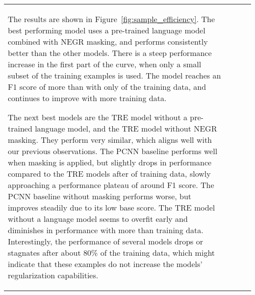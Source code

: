 \documentclass[akbc,twoside,11pt]{article}
\begin{document}
\begin{table}[ht!]
\begin{tabular}{p{6cm} l l l}
The results are shown in Figure~\ref{fig:sample_efficiency}. The best performing model uses a pre-trained language model combined with NEGR masking, and performs consistently better than the other models. There is a steep performance increase in the first part of the curve, when only a small subset of the training examples is used. The model reaches an F1 score of more than  with only  of the training data, and continues to improve with more training data. 

The next best models are the TRE model without a pre-trained language model, and the TRE model without NEGR masking. They perform very similar, which aligns well with our previous observations. The PCNN baseline performs well when masking is applied, but slightly drops in performance compared to the TRE models after  of training data, slowly approaching a performance plateau of around  F1 score. The PCNN baseline without masking performs worse, but improves steadily due to its low base score. The TRE model without a language model seems to overfit early and diminishes in performance with more than  training data. Interestingly, the performance of several models drops or stagnates after about 80\% of the training data, which might indicate that these examples do not increase the models' regularization capabilities.



\end{tabular}
\end{table}
\end{document}
